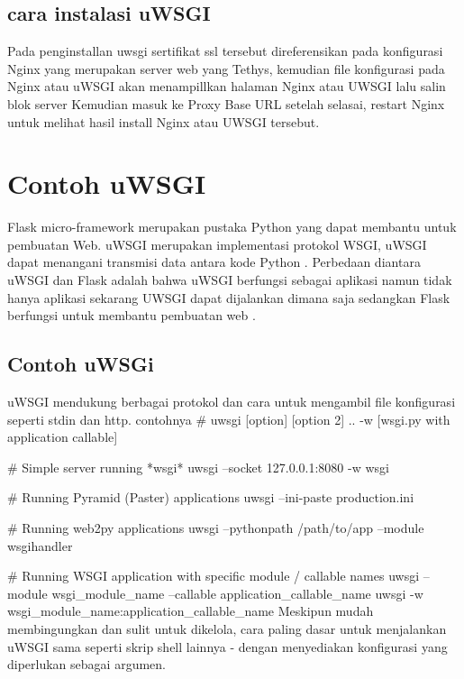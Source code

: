 \subsection {cara instalasi uWSGI}
Pada penginstallan uwsgi sertifikat ssl tersebut direferensikan pada konfigurasi Nginx yang merupakan server web yang Tethys, kemudian file konfigurasi pada Nginx atau uWSGI akan menampillkan halaman Nginx atau UWSGI lalu salin blok server Kemudian masuk ke Proxy Base URL setelah selasai, restart Nginx untuk melihat hasil install Nginx atau UWSGI tersebut\cite{pellicer2016desarrollo}.

\section{Contoh uWSGI}
Flask micro-framework merupakan pustaka Python yang dapat membantu untuk pembuatan Web. uWSGI merupakan implementasi protokol WSGI, uWSGI dapat menangani transmisi data
antara kode Python . Perbedaan diantara uWSGI dan Flask adalah bahwa uWSGI berfungsi sebagai aplikasi namun tidak hanya aplikasi sekarang UWSGI dapat dijalankan dimana saja sedangkan Flask berfungsi untuk membantu pembuatan web \cite{mulerolinked}.

\subsection{Contoh uWSGi}
uWSGI mendukung berbagai protokol dan cara untuk mengambil file  konfigurasi seperti stdin dan http. contohnya
# uwsgi [option] [option 2] .. -w [wsgi.py with application callable]

# Simple server running *wsgi*
uwsgi --socket 127.0.0.1:8080 -w wsgi

# Running Pyramid (Paster) applications
uwsgi --ini-paste production.ini

# Running web2py applications
uwsgi --pythonpath /path/to/app --module wsgihandler

# Running WSGI application with specific module / callable names
uwsgi --module wsgi_module_name --callable application_callable_name
uwsgi -w wsgi_module_name:application_callable_name
Meskipun mudah membingungkan dan sulit untuk dikelola, cara paling dasar untuk menjalankan uWSGI sama seperti skrip shell lainnya - dengan menyediakan konfigurasi yang diperlukan sebagai argumen\cite{cencini2017data}.

